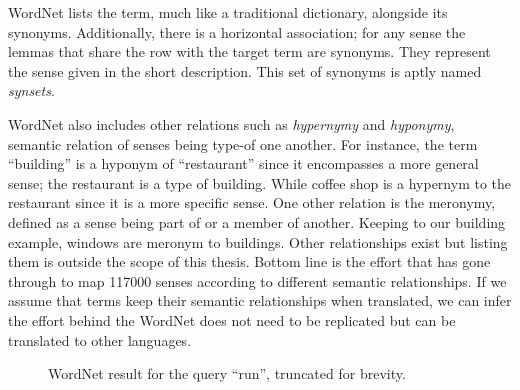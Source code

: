 WordNet lists the term, much like a traditional dictionary, alongside its synonyms.
Additionally, there is a horizontal association; for any sense the lemmas that share the row with the target term are synonyms.
They represent the sense given in the short description.
This set of synonyms is aptly named \emph{synsets}.

WordNet also includes other relations such as \emph{hypernymy} and \emph{hyponymy}, semantic relation of senses being type-of one another.
For instance, the term \enquote{building} is a hyponym of \enquote{restaurant} since it encompasses a more general sense; the restaurant is a type of building.
While coffee shop is a hypernym to the restaurant since it is a more specific sense.
One other relation is the meronymy, defined as a sense being part of or a member of another.
Keeping to our building example, windows are meronym to buildings.
Other relationships exist but listing them is outside the scope of this thesis.
Bottom line is the effort that has gone through to map 117000 senses according to different semantic relationships.
If we assume that terms keep their semantic relationships when translated, we can infer the effort behind the WordNet does not need to be replicated but can be translated to other languages.

\begin{figure}[!hbp]
    \begin{center}
        {%
            \setlength{\fboxsep}{1pt}%
            \setlength{\fboxrule}{1pt}%
        }%
        \caption{WordNet result for the query \enquote{run}, truncated for brevity.}\label{fig:example_run}
    \end{center}
\end{figure}

